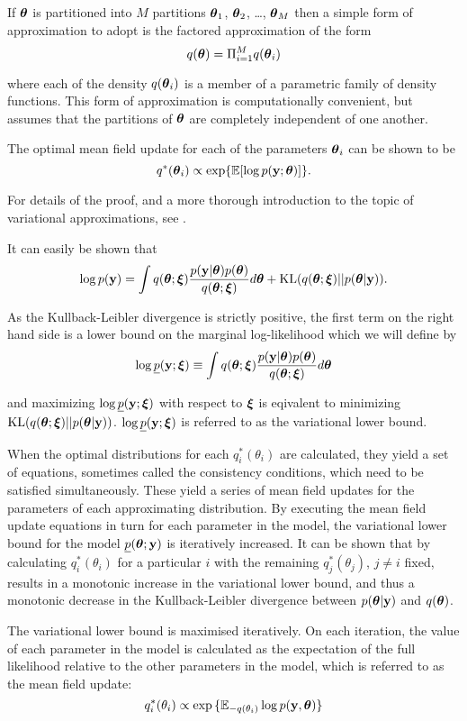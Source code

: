 If ${\boldsymbol \theta}$ is partitioned into $M$ partitions ${\boldsymbol \theta}_1$, ${\boldsymbol \theta}_2$, \ldots, ${\boldsymbol \theta}_M$ then a 
simple form of approximation to adopt is the factored approximation of the form
\[
	q({\boldsymbol \theta}) = \Pi_{i=1}^M q({\boldsymbol \theta}_i)
\]

where each of the density $q({\boldsymbol \theta}_i)$ is a member of a parametric family of density functions. This form of
approximation is computationally convenient, but assumes that the partitions of ${\boldsymbol \theta}$ are completely
independent of one another.

The optimal mean field update for each of the parameters ${\boldsymbol \theta}_i$ can be shown to be
\[
	q^*({\boldsymbol \theta}_i) \propto \exp \{ \mathbb{E} [\log p({\bf y}; {\boldsymbol \theta})] \}.
\]

For details of the proof, and a more thorough introduction to the topic of variational approximations, see
\cite{Ormerod2010}.

\noindent It can easily be shown that
\[
	\displaystyle \log p({\bf y}) = \int q({\boldsymbol \theta};{\boldsymbol \xi})\frac{p({\bf y}|{\boldsymbol \theta})p({\boldsymbol \theta})}{q({\boldsymbol \theta};{\boldsymbol \xi})} d{\boldsymbol \theta} + \text{KL}(q({\boldsymbol \theta};{\boldsymbol \xi})||p({\boldsymbol \theta}|{\bf y})).
\]

\noindent As the Kullback-Leibler divergence is strictly positive, the first term on the right hand side
is a lower bound on the marginal log-likelihood which we will define by
$$
\displaystyle \log \underline{p}({\bf y};{\boldsymbol \xi}) \equiv \int q({\boldsymbol \theta};{\boldsymbol \xi})\frac{p({\bf y}|{\boldsymbol \theta})p({\boldsymbol \theta})}{q({\boldsymbol \theta};{\boldsymbol \xi})} d{\boldsymbol \theta}
$$

\noindent and maximizing $\log \underline{p}({\bf y};{\boldsymbol \xi})$ with respect to ${\boldsymbol \xi}$ is eqivalent to minimizing
$\text{KL}(q({\boldsymbol \theta};{\boldsymbol \xi})||p({\boldsymbol \theta}|{\bf y}))$. $\log \underline{p}({\bf y};{\boldsymbol \xi})$ is referred to as the
variational lower bound.

\noindent When the optimal distributions for each $q_i^*(\theta_i)$ are calculated, they yield a set of
equations, sometimes called the consistency conditions, which need to be  satisfied simultaneously. These
yield a series of mean field updates for the parameters of each approximating distribution. By executing the
mean field update equations in turn for each parameter in the model, the variational lower bound for the model
$\underline{p}({\boldsymbol \theta}; {\bf y})$ is iteratively increased. It can be shown that by calculating $q_i^*(\theta_i)$ for 
a particular $i$ with the remaining $q_j^*(\theta_j)$, $j\ne i$ fixed, results in a monotonic increase in the
variational lower bound, and thus a monotonic decrease in the Kullback-Leibler divergence between
$p({\boldsymbol \theta}|{\bf y})$ and $q({\boldsymbol \theta})$.

\noindent The variational lower bound is maximised iteratively. On each iteration, the value of each parameter
in the model is calculated as the expectation of the full likelihood relative to the other parameters in the
model, which is referred to as the mean field update:
$$q_i^*(\theta_i) \propto \exp{\{ {\mathbb E}_{-q(\theta_i)} \log p({\bf y}, {\boldsymbol\theta}) \}}$$

